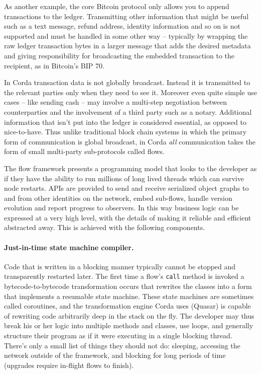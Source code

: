 \documentclass{article}
\begin{document}
As another example, the core Bitcoin protocol only allows you to append transactions to the ledger. Transmitting
other information that might be useful such as a text message, refund address, identity information and so on is
not supported and must be handled in some other way -- typically by wrapping the raw ledger transaction bytes in a
larger message that adds the desired metadata and giving responsibility for broadcasting the embedded transaction
to the recipient, as in Bitcoin's BIP 70\cite{BIP70}.

In Corda transaction data is not globally broadcast. Instead it is transmitted to the relevant parties only when
they need to see it. Moreover even quite simple use cases -- like sending cash -- may involve a multi-step
negotiation between counterparties and the involvement of a third party such as a notary. Additional information
that isn't put into the ledger is considered essential, as opposed to nice-to-have. Thus unlike traditional block
chain systems in which the primary form of communication is global broadcast, in Corda \emph{all} communication
takes the form of small multi-party sub-protocols called flows.

The flow framework presents a programming model that looks to the developer as if they have the ability to run
millions of long lived threads which can survive node restarts. APIs are provided to send and receive serialized
object graphs to and from other identities on the network, embed sub-flows, handle version evolution and report
progress to observers. In this way business logic can be expressed at a very high level, with the details of making
it reliable and efficient abstracted away. This is achieved with the following components.

\paragraph{Just-in-time state machine compiler.}Code that is written in a blocking manner typically cannot be
stopped and transparently restarted later. The first time a flow's \texttt{call} method is invoked a
bytecode-to-bytecode transformation occurs that rewrites the classes into a form that implements a resumable state
machine. These state machines are sometimes called coroutines, and the transformation engine Corda uses (Quasar) is
capable of rewriting code arbitrarily deep in the stack on the fly. The developer may thus break his or her logic
into multiple methods and classes, use loops, and generally structure their program as if it were executing in a
single blocking thread. There's only a small list of things they should not do: sleeping, accessing the
network outside of the framework, and blocking for long periods of time (upgrades require in-flight flows to finish).
\end{document}
